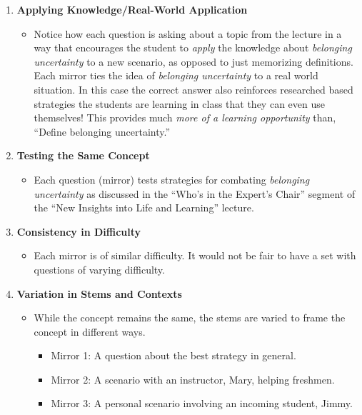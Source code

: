 \documentclass[
]{article}
\providecommand{\tightlist}{%
  \setlength{\itemsep}{0pt}\setlength{\parskip}{0pt}}
\begin{document}
\begin{enumerate}
\def\labelenumi{\arabic{enumi}.}
\tightlist
\item
  \textbf{Applying Knowledge/Real-World Application}

  \begin{itemize}
  \tightlist
  \item
    Notice how each question is asking about a topic from the lecture in a way that encourages the student to \emph{apply} the knowledge about \emph{belonging uncertainty} to a new scenario, as opposed to just memorizing definitions. Each mirror ties the idea of \emph{belonging uncertainty} to a real world situation. In this case the correct answer also reinforces researched based strategies the students are learning in class that they can even use themselves! This provides much \emph{more of a learning opportunity} than, ``Define belonging uncertainty.''
  \end{itemize}
\item
  \textbf{Testing the Same Concept}

  \begin{itemize}
  \tightlist
  \item
    Each question (mirror) tests strategies for combating \emph{belonging uncertainty} as discussed in the ``Who's in the Expert's Chair'' segment of the ``New Insights into Life and Learning'' lecture.
  \end{itemize}
\item
  \textbf{Consistency in Difficulty}

  \begin{itemize}
  \tightlist
  \item
    Each mirror is of similar difficulty. It would not be fair to have a set with questions of varying difficulty.
  \end{itemize}
\item
  \textbf{Variation in Stems and Contexts}

  \begin{itemize}
  \tightlist
  \item
    While the concept remains the same, the stems are varied to frame the concept in different ways.

    \begin{itemize}
    \tightlist
    \item
      Mirror 1: A question about the best strategy in general.
    \item
      Mirror 2: A scenario with an instructor, Mary, helping freshmen.
    \item
      Mirror 3: A personal scenario involving an incoming student, Jimmy.
    \end{itemize}
  \end{itemize}
\end{enumerate}
\end{document}
